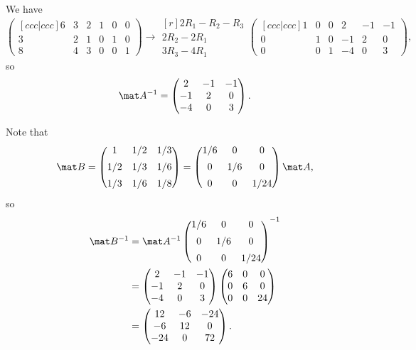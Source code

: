 \begin{solution}
    We have \[\begin{pmatrix}[ccc|ccc] 6 & 3 & 2 & 1 & 0 & 0 \\ 3 & 2 & 1 & 0 & 1 & 0 \\ 8 & 4 & 3 & 0 & 0 & 1\end{pmatrix} \rightarrow \begin{matrix}[r]\scriptstyle 2R_1 - R_2 - R_3 \\ \scriptstyle 2R_2-2R_1 \\ \scriptstyle 3R_3 - 4R_1\end{matrix} \begin{pmatrix}[ccc|ccc] 1 & 0 & 0 & 2 & -1 & -1 \\ 0 & 1 & 0 & -1 & 2 & 0 \\ 0 & 0 & 1 & -4 & 0 & 3\end{pmatrix},\] so \[\mat A^{-1} = \begin{pmatrix}2 & -1 & -1 \\ -1 & 2 & 0 \\ -4 & 0 & 3\end{pmatrix}.\]

    Note that \[\mat B = \begin{pmatrix}1 & 1/2 & 1/3 \\[0.5em] 1/2 & 1/3 & 1/6 \\[0.5em] 1/3 & 1/6 & 1/8\end{pmatrix} = \begin{pmatrix}1/6 & 0 & 0 \\[0.5em] 0 & 1/6 & 0 \\[0.5em] 0 & 0 & 1/24\end{pmatrix} \mat A,\] so
    \begin{align*}
        \mat B^{-1} &= \mat A^{-1} \begin{pmatrix}1/6 & 0 & 0 \\[0.5em] 0 & 1/6 & 0 \\[0.5em] 0 & 0 & 1/24\end{pmatrix}^{-1}\\
        &= \begin{pmatrix}2 & -1 & -1 \\ -1 & 2 & 0 \\ -4 & 0 & 3\end{pmatrix} \begin{pmatrix}6 & 0 & 0 \\ 0 & 6 & 0 \\ 0 & 0 & 24\end{pmatrix}\\
        &= \begin{pmatrix}12 & -6 & -24 \\ -6 & 12 & 0 \\ -24 & 0 & 72\end{pmatrix}.
    \end{align*}


\end{solution}
